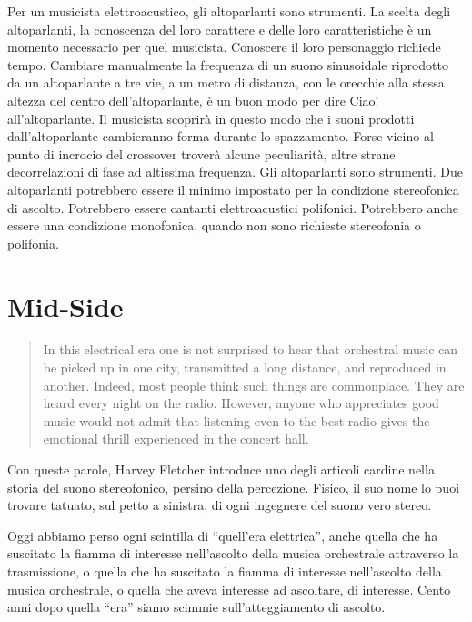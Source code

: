 Per un musicista elettroacustico, gli altoparlanti sono strumenti. La scelta
degli altoparlanti, la conoscenza del loro carattere e delle loro
caratteristiche è un momento necessario per quel musicista. Conoscere il loro
personaggio richiede tempo. Cambiare manualmente la frequenza di un suono
sinusoidale riprodotto da un altoparlante a tre vie, a un metro di distanza,
con le orecchie alla stessa altezza del centro dell'altoparlante, è un buon modo
per dire Ciao! all'altoparlante. Il musicista scoprirà in questo modo che i
suoni prodotti dall'altoparlante cambieranno forma durante lo spazzamento. Forse
vicino al punto di incrocio del crossover troverà alcune peculiarità, altre
strane decorrelazioni di fase ad altissima frequenza. Gli altoparlanti sono
strumenti. Due altoparlanti potrebbero essere il minimo impostato per la
condizione stereofonica di ascolto. Potrebbero essere cantanti elettroacustici
polifonici. Potrebbero anche essere una condizione monofonica, quando non sono
richieste stereofonia o polifonia.%

\section{Mid-Side}

\begin{quotation}
In this electrical era one is not surprised to hear that orchestral music can be
picked up in one city, transmitted a long distance, and reproduced in another.
Indeed, most people think such things are commonplace. They are heard every
night on the radio. However, anyone who appreciates good music would not admit
that listening even to the best radio gives the emotional thrill experienced in
the concert hall. \cite{hf34}
\end{quotation}

Con queste parole, Harvey Fletcher introduce uno degli articoli cardine nella
storia del suono stereofonico, persino della percezione. Fisico, il suo nome lo
puoi trovare tatuato, sul petto a sinistra, di ogni ingegnere del suono vero
stereo.

Oggi abbiamo perso ogni scintilla di “quell'era elettrica”, anche quella che ha
suscitato la fiamma di interesse nell'ascolto della musica orchestrale
attraverso la trasmissione, o quella che ha suscitato la fiamma di interesse
nell'ascolto della musica orchestrale, o quella che aveva interesse ad
ascoltare, di interesse. Cento anni dopo quella “era” siamo scimmie
sull'atteggiamento di ascolto.

